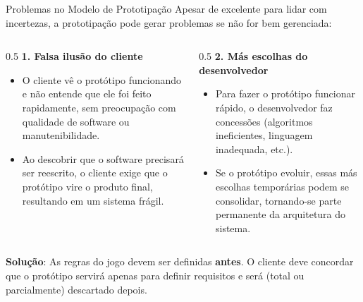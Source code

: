 \documentclass[9pt]{beamer}
\begin{document}
\begin{frame}{Problemas no Modelo de Prototipação}
  Apesar de excelente para lidar com incertezas, a prototipação pode gerar problemas se não for bem gerenciada:

  \vspace{0.3cm}
  \begin{columns}[t]
    \begin{column}{0.5\textwidth}
      \colorbox{red!10}{\textbf{1. Falsa ilusão do cliente}}
      \vspace{0.2cm}
      \small
      
      \begin{itemize}
        \item O cliente vê o protótipo funcionando e não entende que ele foi feito rapidamente, sem preocupação com qualidade de software ou manutenibilidade.
        \item Ao descobrir que o software precisará ser reescrito, o cliente exige que o protótipo vire o produto final, resultando em um sistema frágil.
      \end{itemize}
    \end{column}
    
    \begin{column}{0.5\textwidth}
      \colorbox{orange!10}{\textbf{2. Más escolhas do desenvolvedor}}
      \vspace{0.2cm}
      \small
      
      \begin{itemize}
        \item Para fazer o protótipo funcionar rápido, o desenvolvedor faz concessões (algoritmos ineficientes, linguagem inadequada, etc.).
        \item Se o protótipo evoluir, essas más escolhas temporárias podem se consolidar, tornando-se parte permanente da arquitetura do sistema.
      \end{itemize}
    \end{column}
  \end{columns}

  \vspace{0.4cm}
  \centering
  \colorbox{yellow!15}{
    \parbox{0.9\textwidth}{
      \scriptsize
      \textbf{Solução}: As regras do jogo devem ser definidas \textbf{antes}. O cliente deve concordar que o protótipo servirá apenas para definir requisitos e será (total ou parcialmente) descartado depois.
    }
  }
\end{frame}

\end{document}

